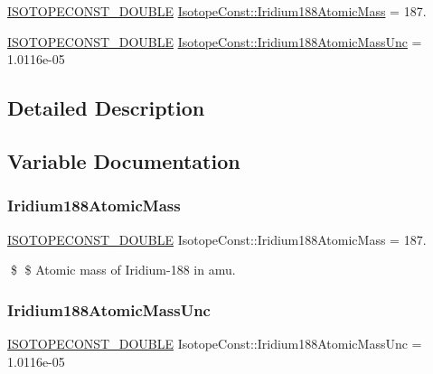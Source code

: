 \begin{DoxyCompactItemize}
\item 
\mbox{\hyperlink{group___isotope_const-_macros_ga8f45a7272ce02c0b4c65c44636ed719a}{I\+S\+O\+T\+O\+P\+E\+C\+O\+N\+S\+T\+\_\+\+D\+O\+U\+B\+LE}} \mbox{\hyperlink{group___isotope_const-_iridium-_ir188_gab39f69a1988a48218f44a50a266addfe}{Isotope\+Const\+::\+Iridium188\+Atomic\+Mass}} = 187.
\item 
\mbox{\hyperlink{group___isotope_const-_macros_ga8f45a7272ce02c0b4c65c44636ed719a}{I\+S\+O\+T\+O\+P\+E\+C\+O\+N\+S\+T\+\_\+\+D\+O\+U\+B\+LE}} \mbox{\hyperlink{group___isotope_const-_iridium-_ir188_ga07521cc940a7f8cd76aa90af7f5a721b}{Isotope\+Const\+::\+Iridium188\+Atomic\+Mass\+Unc}} = 1.\+0116e-\/05
\end{DoxyCompactItemize}


\subsection{Detailed Description}


\subsection{Variable Documentation}
\mbox{\label{group___isotope_const-_iridium-_ir188_gab39f69a1988a48218f44a50a266addfe}} 
\subsubsection{\texorpdfstring{Iridium188\+Atomic\+Mass}{Iridium188AtomicMass}}
{\footnotesize\ttfamily \mbox{\hyperlink{group___isotope_const-_macros_ga8f45a7272ce02c0b4c65c44636ed719a}{I\+S\+O\+T\+O\+P\+E\+C\+O\+N\+S\+T\+\_\+\+D\+O\+U\+B\+LE}} Isotope\+Const\+::\+Iridium188\+Atomic\+Mass = 187.}

\$ \$ Atomic mass of Iridium-\/188 in amu. \mbox{\label{group___isotope_const-_iridium-_ir188_ga07521cc940a7f8cd76aa90af7f5a721b}} 
\subsubsection{\texorpdfstring{Iridium188\+Atomic\+Mass\+Unc}{Iridium188AtomicMassUnc}}
{\footnotesize\ttfamily \mbox{\hyperlink{group___isotope_const-_macros_ga8f45a7272ce02c0b4c65c44636ed719a}{I\+S\+O\+T\+O\+P\+E\+C\+O\+N\+S\+T\+\_\+\+D\+O\+U\+B\+LE}} Isotope\+Const\+::\+Iridium188\+Atomic\+Mass\+Unc = 1.\+0116e-\/05}

